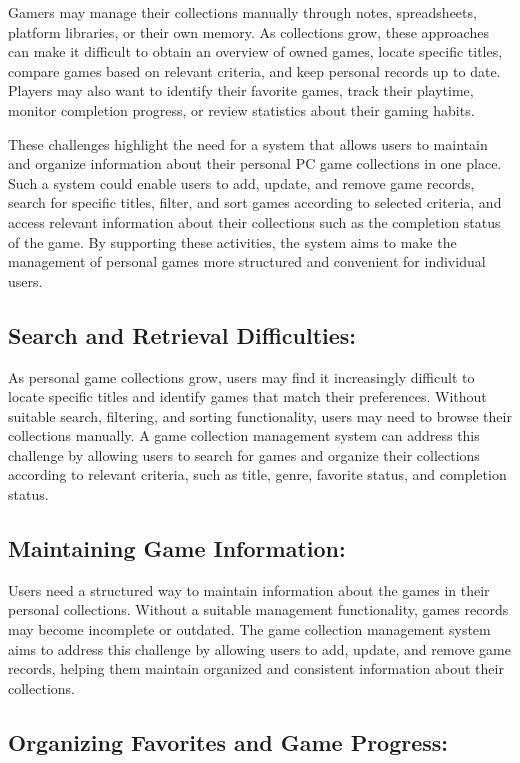 \documentclass[11pt]{article}
\begin{document}
Gamers may manage their collections manually through notes, spreadsheets, platform libraries, or their own memory. As collections grow, these approaches can make it difficult to obtain an overview of owned games, locate specific titles, compare games based on relevant criteria, and keep personal records up to date. Players may also want to identify their favorite games, track their playtime, monitor completion progress, or review statistics about their gaming habits.

These challenges highlight the need for a system that allows users to maintain and organize information about their personal PC game collections in one place. Such a system could enable users to add, update, and remove game records, search for specific titles, filter, and sort games according to selected criteria, and access relevant information about their collections such as the completion status of the game. By supporting these activities, the system aims to make the management of personal games more structured and convenient for individual users.

\subsection{Search and Retrieval Difficulties:}

As personal game collections grow, users may find it increasingly difficult to locate specific titles and identify games that match their preferences. Without suitable search, filtering, and sorting functionality, users may need to browse their collections manually. A game collection management system can address this challenge by allowing users to search for games and organize their collections according to relevant criteria, such as title, genre, favorite status, and completion status.

\subsection{Maintaining Game Information:}

Users need a structured way to maintain information about the games in their personal collections. Without a suitable management functionality, games records may become incomplete or outdated. The game collection management system aims to address this challenge by allowing users to add, update, and remove game records, helping them maintain organized and consistent information about their collections.


\subsection{Organizing Favorites and Game Progress: }
\end{document}
